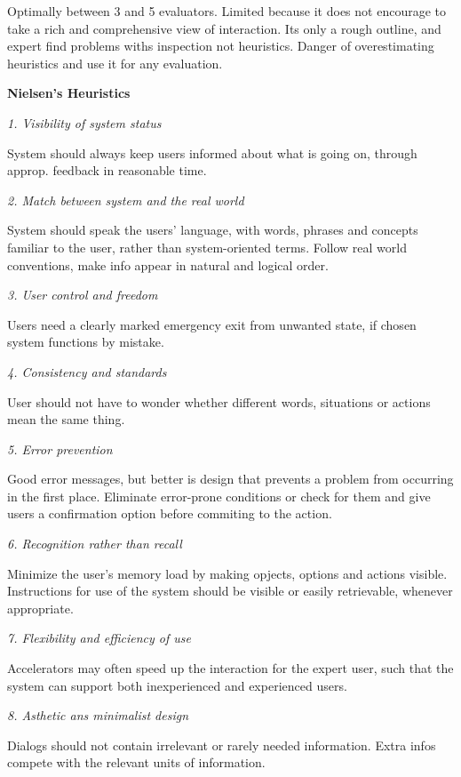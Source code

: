 Optimally between 3 and 5 evaluators. Limited because it does not encourage to take a rich and comprehensive view of interaction. Its only a rough outline, and expert find problems withs inspection not heuristics. 
Danger of overestimating heuristics and use it for any evaluation. \medskip

\textbf{Nielsen's Heuristics} \smallskip


\textit{1. Visibility of system status} \smallskip

System should always keep users informed about what is going on, through approp. feedback in reasonable time. \medskip

\textit{2. Match between system and the real world} \smallskip

System should speak the users' language, with words, phrases and concepts familiar to the user, rather than system-oriented terms. Follow real world conventions, make info appear in natural and logical order. \medskip

\textit{3. User control and freedom} \smallskip

Users need a clearly marked emergency exit from unwanted state, if chosen system functions by mistake. \medskip

\textit{4. Consistency and standards} \smallskip

User should not have to wonder whether different words, situations or actions mean the same thing. \medskip

\textit{5. Error prevention} \smallskip

Good error messages, but better is design that prevents a problem  from occurring in the first place. Eliminate error-prone conditions or check for them and give users a confirmation option before commiting to the action. \medskip

\textit{6. Recognition rather than recall} \smallskip

Minimize the user's memory load by making opjects, options and actions visible. Instructions for use of the system should be visible or easily retrievable, whenever appropriate. \medskip

\textit{7. Flexibility and efficiency of use} \smallskip

Accelerators may often speed up the interaction for the expert user, such that the system can support both inexperienced and experienced users. \medskip

\textit{8. Asthetic ans minimalist design} \smallskip

Dialogs should not contain irrelevant or rarely needed information. Extra infos compete with the relevant units of information. \medskip


